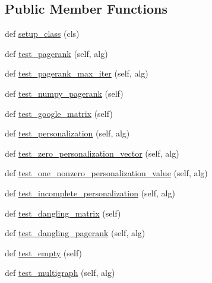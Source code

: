 \subsection*{Public Member Functions}
\begin{DoxyCompactItemize}
\item 
def \hyperlink{classnetworkx_1_1algorithms_1_1link__analysis_1_1tests_1_1test__pagerank_1_1TestPageRank_a9544da75c20f40c0c355e77f1bf9d6ff}{setup\+\_\+class} (cls)
\item 
def \hyperlink{classnetworkx_1_1algorithms_1_1link__analysis_1_1tests_1_1test__pagerank_1_1TestPageRank_a71c8b791c6a9093e894d22ab00f8f54f}{test\+\_\+pagerank} (self, alg)
\item 
def \hyperlink{classnetworkx_1_1algorithms_1_1link__analysis_1_1tests_1_1test__pagerank_1_1TestPageRank_a22e347aa8dc3a2a00edce393c6f469c0}{test\+\_\+pagerank\+\_\+max\+\_\+iter} (self, alg)
\item 
def \hyperlink{classnetworkx_1_1algorithms_1_1link__analysis_1_1tests_1_1test__pagerank_1_1TestPageRank_aba735e73a3c4e09db6bf87de3eded1d6}{test\+\_\+numpy\+\_\+pagerank} (self)
\item 
def \hyperlink{classnetworkx_1_1algorithms_1_1link__analysis_1_1tests_1_1test__pagerank_1_1TestPageRank_aaa4e0921b7316a00bc9fb064fe56a88b}{test\+\_\+google\+\_\+matrix} (self)
\item 
def \hyperlink{classnetworkx_1_1algorithms_1_1link__analysis_1_1tests_1_1test__pagerank_1_1TestPageRank_adf845188c8c4e6dd8957b684a7cc72d4}{test\+\_\+personalization} (self, alg)
\item 
def \hyperlink{classnetworkx_1_1algorithms_1_1link__analysis_1_1tests_1_1test__pagerank_1_1TestPageRank_aff57af22afd2ef7df13d76da992407a5}{test\+\_\+zero\+\_\+personalization\+\_\+vector} (self, alg)
\item 
def \hyperlink{classnetworkx_1_1algorithms_1_1link__analysis_1_1tests_1_1test__pagerank_1_1TestPageRank_aa65998a077f2d284ef68a6e8fb825ace}{test\+\_\+one\+\_\+nonzero\+\_\+personalization\+\_\+value} (self, alg)
\item 
def \hyperlink{classnetworkx_1_1algorithms_1_1link__analysis_1_1tests_1_1test__pagerank_1_1TestPageRank_a2299da8344a2b0edb94acbb30cd44f31}{test\+\_\+incomplete\+\_\+personalization} (self, alg)
\item 
def \hyperlink{classnetworkx_1_1algorithms_1_1link__analysis_1_1tests_1_1test__pagerank_1_1TestPageRank_a97c5e42391b0c4092d8d22cb8618c29e}{test\+\_\+dangling\+\_\+matrix} (self)
\item 
def \hyperlink{classnetworkx_1_1algorithms_1_1link__analysis_1_1tests_1_1test__pagerank_1_1TestPageRank_ad28ab01795a96f93fd3a9539d120216d}{test\+\_\+dangling\+\_\+pagerank} (self, alg)
\item 
def \hyperlink{classnetworkx_1_1algorithms_1_1link__analysis_1_1tests_1_1test__pagerank_1_1TestPageRank_ac5b5bb52e9b273df30cdcc14eeb46389}{test\+\_\+empty} (self)
\item 
def \hyperlink{classnetworkx_1_1algorithms_1_1link__analysis_1_1tests_1_1test__pagerank_1_1TestPageRank_a2418fe4747359f73412b8e49b4dd3221}{test\+\_\+multigraph} (self, alg)
\end{DoxyCompactItemize}
